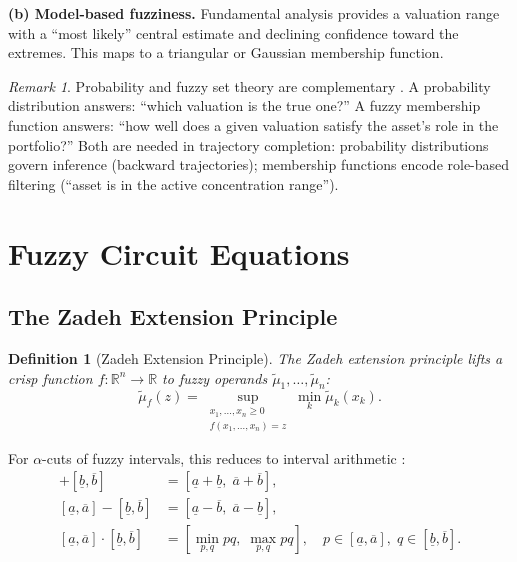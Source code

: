 \documentclass[twocolumn,10pt]{article}
\newtheorem{definition}[theorem]{Definition}
\theoremstyle{remark}
\newtheorem{remark}[theorem]{Remark}
\newcommand{\fuzzyset}[1]{\tilde{\mu}_{#1}}
\begin{document}
\textbf{(b) Model-based fuzziness.}  Fundamental analysis provides a valuation range with a ``most likely'' central estimate and declining confidence toward the extremes.  This maps to a triangular or Gaussian membership function.

\begin{remark}
Probability and fuzzy set theory are complementary \cite{zadeh1978}.  A probability distribution answers: ``which valuation is the true one?''  A fuzzy membership function answers: ``how well does a given valuation satisfy the asset's role in the portfolio?''  Both are needed in trajectory completion: probability distributions govern inference (backward trajectories); membership functions encode role-based filtering (``asset is in the active concentration range'').
\end{remark}


\section{Fuzzy Circuit Equations}
\label{sec:fuzzy_circuit_eqns}

\subsection{The Zadeh Extension Principle}

\begin{definition}[Zadeh Extension Principle]
\label{def:zadeh_extension}
The Zadeh extension principle \cite{zadeh1965,zadeh1978} lifts a crisp function $f : \mathbb{R}^n \to \mathbb{R}$ to fuzzy operands $\fuzzyset{1}, \ldots, \fuzzyset{n}$:
\begin{equation}
    \tilde{\mu}_f(z) = \sup_{\substack{x_1, \ldots, x_n \geq 0 \\ f(x_1, \ldots, x_n) = z}} \min_k \fuzzyset{k}(x_k).
    \label{eq:zadeh_extension}
\end{equation}
\end{definition}

For $\alpha$-cuts of fuzzy intervals, this reduces to interval arithmetic \cite{zimmermann2001}:
\begin{align}
    [\underline{a}, \overline{a}] + [\underline{b}, \overline{b}] &= [\underline{a} + \underline{b}, \; \overline{a} + \overline{b}], \label{eq:interval_add} \\
    [\underline{a}, \overline{a}] - [\underline{b}, \overline{b}] &= [\underline{a} - \overline{b}, \; \overline{a} - \underline{b}], \label{eq:interval_sub} \\
    [\underline{a}, \overline{a}] \cdot [\underline{b}, \overline{b}] &= [\min_{p,q} pq, \; \max_{p,q} pq], \quad p \in [\underline{a}, \overline{a}],\; q \in [\underline{b}, \overline{b}]. \label{eq:interval_mul}
\end{align}
\end{document}
